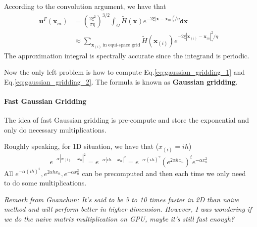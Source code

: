 \documentclass{article}[12pt]
\begin{document}
According to the convolution argument, we have that
\begin{align}
\mathbf{u}^F (\mathbf{x}_m) & =  \left(\frac{2 \xi^2}{\pi \eta}\right)^{3/2}  \int_{\Omega} \tilde{H}(\mathbf{x}) e^{-2 \xi |\mathbf{x} - \mathbf{x}_m|_{\ast}^2 / \eta} \mathtt{d} \mathbf{x} \\
& \approx \sum_{\mathbf{x}_{(i)} \ \text{in equi-space grid}} \tilde{H}(\mathbf{x}_{(i)}) e^{-2 \xi |\mathbf{x}_{(i)} - \mathbf{x}_m|_{\ast}^2 / \eta} \label{eq:gaussian_gridding_2}
\end{align}
The approximation integral is spectrally accurate since the integrand is periodic.

Now the only left problem is how to compute Eq.\eqref{eq:gaussian_gridding_1} and Eq.\eqref{eq:gaussian_gridding_2}. The formula is known as \textbf{Gaussian gridding}.

\paragraph{Fast Gaussian Gridding} The idea of fast Gaussian gridding is pre-compute and store the exponential and only do necessary multiplications.

Roughly speaking, for 1D situation, we have that ($x_{(i)} = ih$)
\begin{equation}
e^{-\alpha|x_{(i)} - x_n|^2} = e^{-\alpha|ih - x_n|^2} = e^{-\alpha (ih)^2} \left(e^{2 \alpha h x_n}\right)^i e^{-\alpha x_n^2}
\end{equation}
All $e^{-\alpha (ih)^2}, e^{2 \alpha h x_n}, e^{-\alpha x_n^2}$ can be precomputed and then each time we only need to do some multiplications. 

\textit{Remark from Guanchun: It's said to be 5 to 10 times faster in 2D than naive method and will perform better in higher dimension. However, I was wondering if we do the naive matrix multiplication on GPU, maybe it's still fast enough?}
\end{document}
